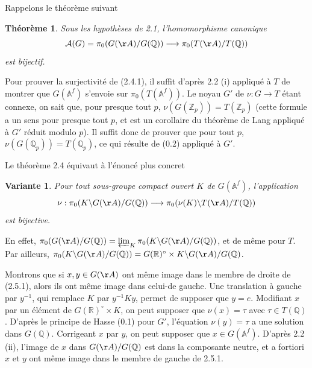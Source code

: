 \documentclass[11pt]{amsart}
\theoremstyle{plain}
\newtheorem{theorem}{Th\'eor\`eme}[section]
\newtheorem{variante}{Variante}
\theoremstyle{definition}
\newcommand{\ZZ}{\mathbb{Z}}
\newcommand{\QQ}{\mathbb{Q}}
\newcommand{\RR}{\mathbb{R}}
\newcommand{\AAf}{\mathbb{A}^f}
\begin{document}
Rappelons le th\'eor\`eme suivant

\begin{theorem}
Sous les hypoth\`eses de \emph{2.1}, l'homomorphisme canonique
\begin{equation}\label{eq:2.4.1}
\mathcal{A}(G) = \pi_0(G(\AA)/G(\QQ)) \longrightarrow \pi_0(T(\AA)/T(\QQ))
\end{equation}
est bijectif.
\end{theorem}

Pour prouver la surjectivit\'e de (2.4.1), il suffit d'apr\`es 2.2 (i) appliqu\'e \`a $T$ de montrer que $G(\AAf)$ s'envoie sur $\pi_0(T(\AAf))$. Le noyau $G'$ de $\nu : G \to T$ \'etant connexe, on sait que, pour presque tout $p$, $\nu(G(\ZZ_p)) = T(\ZZ_p)$ (cette formule a un sens pour presque tout $p$, et est un corollaire du th\'eor\`eme de Lang appliqu\'e \`a $G'$ r\'eduit modulo $p$). Il suffit donc de prouver que pour tout $p$, $\nu(G(\QQ_p)) = T(\QQ_p)$, ce qui r\'esulte de (0.2) appliqu\'e \`a $G'$.

Le th\'eor\`eme 2.4 \'equivaut \`a l'\'enonc\'e plus concret

\begin{variante}
Pour tout sous-groupe compact ouvert $K$ de $G(\AAf)$, l'application
\begin{equation}\label{eq:2.5.1}
\nu : \pi_0(K \backslash G(\AA)/G(\QQ)) \longrightarrow \pi_0(\nu(K) \backslash T(\AA)/T(\QQ))
\end{equation}
est bijective.
\end{variante}

En effet, $\pi_0(G(\AA)/G(\QQ)) = \varprojlim_K \pi_0(K \backslash G(\AA)/G(\QQ))$, et de m\^eme pour $T$. Par ailleurs, $\pi_0(K \backslash G(\AA)/G(\QQ)) = G(\RR)^\circ \times K \backslash G(\AA)/G(\QQ)$.

Montrons que si $x, y \in G(\AA)$ ont m\^eme image dans le membre de droite de (2.5.1), alors ils ont m\^eme image dans celui-de gauche. Une translation \`a gauche par $y^{-1}$, qui remplace $K$ par $y^{-1} K y$, permet de supposer que $y = e$. Modifiant $x$ par un \'el\'ement de $G(\RR)^\circ \times K$, on peut supposer que $\nu(x) = \tau$ avec $\tau \in T(\QQ)$. D'apr\`es le principe de Hasse (0.1) pour $G'$, l'\'equation $\nu(y) = \tau$ a une solution dans $G(\QQ)$. Corrigeant $x$ par $y$, on peut supposer que $x \in G(\AAf)$. D'apr\`es 2.2 (ii), l'image de $x$ dans $G(\AA)/G(\QQ)$ est dans la composante neutre, et a fortiori $x$ et $y$ ont m\^eme image dans le membre de gauche de 2.5.1.
\end{document}
